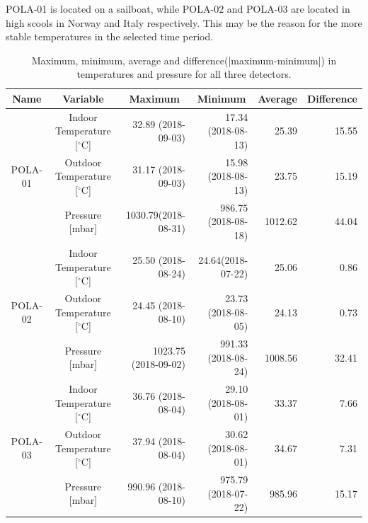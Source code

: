 \documentclass[prX, twocolumn, a4paper]{revtex4}
\begin{document}
POLA-01 is located on a sailboat, while POLA-02 and POLA-03 are located in high scools in Norway and Italy respectively. This may be the reason for the more stable temperatures in the selected time period.

\onecolumngrid
{\centering
\begin{table}
    \centering
    \caption{Maximum, minimum, average and difference(|maximum-minimum|) in temperatures and pressure for all three detectors.}
    \label{tab:temp_press}
    \begin{tabular}{ c | c | r | r | r | r } \hline
    \multicolumn{1}{c}{Name} & \multicolumn{1}{c}{Variable} & \multicolumn{1}{c}{Maximum} & \multicolumn{1}{c}{Minimum} & \multicolumn{1}{c}{Average} & \multicolumn{1}{c}{Difference}\\
    \hline
    & Indoor Temperature [$^\circ$C]  & 32.89 (2018-09-03) & 17.34 (2018-08-13) & 25.39 & 15.55 \\
    POLA-01 & Outdoor Temperature [$^\circ$C]  & 31.17 (2018-09-03) & 15.98 (2018-08-13) & 23.75 & 15.19 \\
    & Pressure [mbar] & 1030.79(2018-08-31) & 986.75 (2018-08-18) & 1012.62 & 44.04\\
    \hline
    &Indoor Temperature [$^\circ$C]  & 25.50 (2018-08-24) & 24.64(2018-07-22) & 25.06 & 0.86\\ 
    POLA-02 & Outdoor Temperature [$^\circ$C] & 24.45 (2018-08-10) & 23.73 (2018-08-05) & 24.13 & 0.73 \\
    &Pressure [mbar] & 1023.75 (2018-09-02) & 991.33 (2018-08-24) & 1008.56 & 32.41 \\
    \hline
    &Indoor Temperature [$^\circ$C]  & 36.76 (2018-08-04) & 29.10 (2018-08-01) & 33.37 & 7.66\\ 
    POLA-03 & Outdoor Temperature [$^\circ$C]  & 37.94 (2018-08-04) & 30.62 (2018-08-01) & 34.67 & 7.31 \\
    &Pressure [mbar] & 990.96 (2018-08-10) & 975.79 (2018-07-22) & 985.96 & 15.17 \\
    \hline
    \end{tabular}
\end{table}\par}
\newpage
\twocolumngrid
\end{document}
